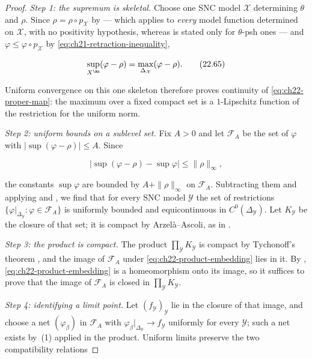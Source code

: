 \begin{proof}
\emph{Step 1: the supremum is skeletal.}  Choose one SNC model
$\mathcal X$ determining $\theta$ and $\rho$.  Since
$\rho=\rho\circ p_{\mathcal X}$ by
 --- which applies to \emph{every} model
function determined on $\mathcal X$, with no positivity hypothesis,
whereas  is stated only for
$\theta$-psh ones --- and
$\varphi\leq\varphi\circ p_{\mathcal X}$ by
\eqref{eq:ch21-retraction-inequality},

\[
 \sup_{X^{\An}}(\varphi-\rho)
 =\max_{\Delta_{\mathcal X}}(\varphi-\rho).
\tag{22.65}\label{eq:ch22-proper-map-skeletal}
\]

Uniform convergence on this one skeleton therefore proves continuity of
\eqref{eq:ch22-proper-map}: the maximum over a fixed compact set is a
$1$-Lipschitz function of the restriction for the uniform norm.

\emph{Step 2: uniform bounds on a sublevel set.}  Fix $A>0$ and let
$\mathcal F_A$ be the set of $\varphi$ with
$|\sup(\varphi-\rho)|\leq A$.  Since

\[
 \bigl|\sup(\varphi-\rho)-\sup\varphi\bigr|
       \leq\|\rho\|_{\infty},
\]

the constants $\sup\varphi$ are bounded by
$A+\|\rho\|_\infty$ on $\mathcal F_A$.  Subtracting them and applying
 and
, we find that for every SNC model
$\mathcal Y$ the set of restrictions
$\{\varphi|_{\Delta_{\mathcal Y}}:\varphi\in\mathcal F_A\}$ is uniformly
bounded and equicontinuous in $C^0(\Delta_{\mathcal Y})$.  Let
$K_{\mathcal Y}$ be the closure of that set; it is compact by
Arzel\`a--Ascoli, as in .

\emph{Step 3: the product is compact.}  The product
$\prod_{\mathcal Y}K_{\mathcal Y}$ is compact by Tychonoff's theorem
\cite[Chapter~5]{Kel75}, and the image of $\mathcal F_A$ under
\eqref{eq:ch22-product-embedding} lies in it.  By
, \eqref{eq:ch22-product-embedding} is a
homeomorphism onto its image, so it suffices to prove that the image of
$\mathcal F_A$ is closed in $\prod_{\mathcal Y}K_{\mathcal Y}$.

\emph{Step 4: identifying a limit point.}  Let
$(f_{\mathcal Y})_{\mathcal Y}$ lie in the closure of that image, and
choose a net $(\varphi_\beta)$ in $\mathcal F_A$ with
$\varphi_\beta|_{\Delta_{\mathcal Y}}\to f_{\mathcal Y}$ uniformly for
every $\mathcal Y$; such a net exists by
\,(1) applied in the product.  Uniform limits
preserve the two compatibility relations


\end{proof}
